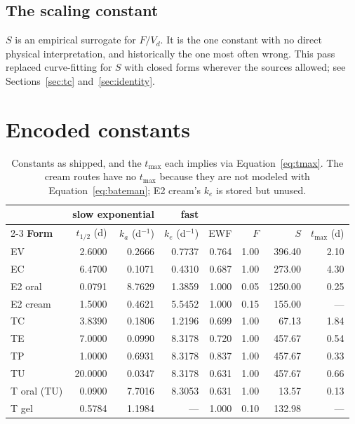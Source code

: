 \documentclass[11pt,a4paper]{article}
\begin{document}
\subsection{The scaling constant}

$S$ is an empirical surrogate for $F/V_d$. It is the one constant with no direct
physical interpretation, and historically the one most often wrong. This pass
replaced curve-fitting for $S$ with closed forms wherever the sources allowed;
see Sections~\ref{sec:tc} and~\ref{sec:identity}.

\section{Encoded constants}

\begin{table}[h]
\centering
\small
\begin{tabular}{@{}lrrrrrrr@{}}
\toprule
& \multicolumn{2}{c}{\textbf{slow exponential}} & \textbf{fast} & & & & \\
\cmidrule(lr){2-3}
\textbf{Form} & $t_{1/2}$ (d) & $k_a$ (d$^{-1}$) & $k_e$ (d$^{-1}$)
              & EWF & $F$ & $S$ & $t_{\max}$ (d) \\
\midrule
EV            & 2.6000 & 0.2666 & 0.7737 & 0.764 & 1.00 & 396.40 & 2.10 \\
EC            & 6.4700 & 0.1071 & 0.4310 & 0.687 & 1.00 & 273.00 & 4.30 \\
E2 oral       & 0.0791 & 8.7629 & 1.3859 & 1.000 & 0.05 & 1250.00 & 0.25 \\
E2 cream      & 1.5000 & 0.4621 & 5.5452 & 1.000 & 0.15 & 155.00 & --- \\
\midrule
TC            & 3.8390 & 0.1806 & 1.2196 & 0.699 & 1.00 & 67.13 & 1.84 \\
TE            & 7.0000 & 0.0990 & 8.3178 & 0.720 & 1.00 & 457.67 & 0.54 \\
TP            & 1.0000 & 0.6931 & 8.3178 & 0.837 & 1.00 & 457.67 & 0.33 \\
TU            & 20.0000 & 0.0347 & 8.3178 & 0.631 & 1.00 & 457.67 & 0.66 \\
T oral (TU)   & 0.0900 & 7.7016 & 8.3053 & 0.631 & 1.00 & 13.57 & 0.13 \\
T gel         & 0.5784 & 1.1984 & ---    & 1.000 & 0.10 & 132.98 & --- \\
\bottomrule
\end{tabular}
\caption{Constants as shipped, and the $t_{\max}$ each implies via
Equation~\ref{eq:tmax}. The cream routes have no $t_{\max}$ because they are not
modeled with Equation~\ref{eq:bateman}; E2 cream's $k_e$ is stored but unused.}
\label{tab:constants}
\end{table}
\end{document}
